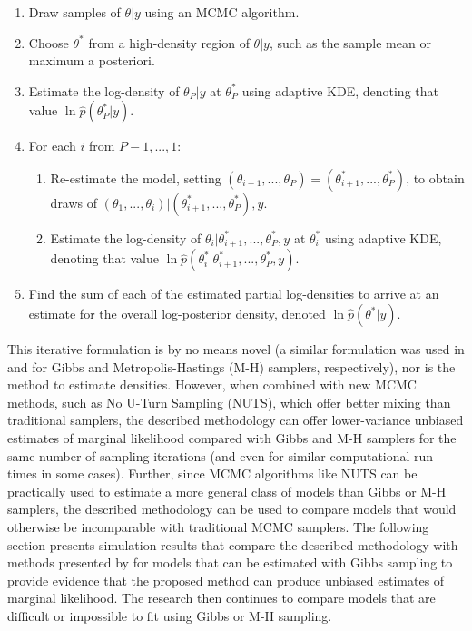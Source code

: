 \documentclass[twocolumn]{article}
\begin{document}
\begin{enumerate}[noitemsep]
	\item Draw samples of $\theta|y$ using an MCMC algorithm.
	\item Choose $\theta^*$ from a high-density region of $\theta|y$, such as the sample mean or maximum a posteriori.
	\item Estimate the log-density of $\theta_P|y$ at $\theta_P^*$ using adaptive KDE, denoting that value $\ln \hat{p}(\theta_P^*|y)$.
	\item For each $i$ from $P-1, ..., 1$:
		\begin{enumerate}
			\item Re-estimate the model, setting $(\theta_{i+1}, ..., \theta_P) = (\theta_{i+1}^*, ..., \theta_P^*)$, to obtain draws of $(\theta_1, ..., \theta_i)|(\theta_{i+1}^*, ..., \theta_P^*), y$.
			\item Estimate the log-density of $\theta_i|\theta_{i+1}^*, ..., \theta_P^*, y$ at $\theta_i^*$ using adaptive KDE, denoting that value $\ln \hat{p}(\theta_i^*|\theta_{i+1}^*, ..., \theta_P^*, y)$.
		\end{enumerate}
	\item Find the sum of each of the estimated partial log-densities to arrive at an estimate for the overall log-posterior density, denoted $\ln \hat{p}(\theta^*|y)$.
\end{enumerate}

This iterative formulation is by no means novel (a similar formulation was used in \cite{Chib} and \cite{ChibJeliazkov} for Gibbs and Metropolis-Hastings (M-H) samplers, respectively), nor is the method to estimate densities. However, when combined with new MCMC methods, such as No U-Turn Sampling (NUTS), which offer better mixing than  traditional samplers, the described methodology can offer lower-variance unbiased estimates of marginal likelihood compared with Gibbs and M-H samplers for the same number of sampling iterations (and even for similar computational run-times in some cases). Further, since MCMC algorithms like NUTS can be practically used to estimate a more general class of models than Gibbs or M-H samplers, the described methodology can be used to compare models that would otherwise be incomparable with traditional MCMC samplers. The following section presents simulation results that compare the described methodology with methods presented by \cite{Chib} for models that can be estimated with Gibbs sampling to provide evidence that the proposed method can produce unbiased estimates of marginal likelihood. The research then continues to compare models that are difficult or impossible to fit using Gibbs or M-H sampling.
\end{document}
